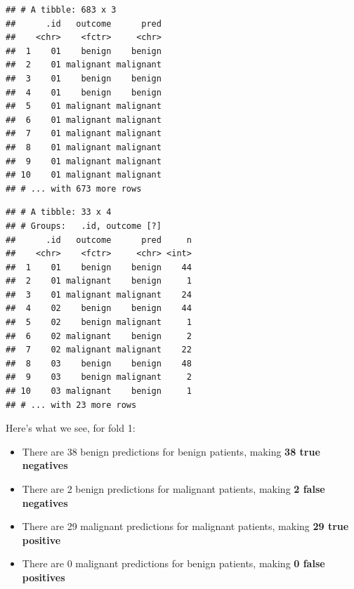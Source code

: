 \documentclass[]{article}
\newenvironment{Shaded}{\begin{snugshade}}{\end{snugshade}}
\newcommand{\KeywordTok}[1]{\textcolor[rgb]{0.13,0.29,0.53}{\textbf{#1}}}
\newcommand{\DataTypeTok}[1]{\textcolor[rgb]{0.13,0.29,0.53}{#1}}
\newcommand{\FloatTok}[1]{\textcolor[rgb]{0.00,0.00,0.81}{#1}}
\newcommand{\StringTok}[1]{\textcolor[rgb]{0.31,0.60,0.02}{#1}}
\newcommand{\OperatorTok}[1]{\textcolor[rgb]{0.81,0.36,0.00}{\textbf{#1}}}
\newcommand{\NormalTok}[1]{#1}
\providecommand{\tightlist}{%
  \setlength{\itemsep}{0pt}\setlength{\parskip}{0pt}}
\begin{document}
\begin{verbatim}
## # A tibble: 683 x 3
##      .id   outcome      pred
##    <chr>    <fctr>     <chr>
##  1    01    benign    benign
##  2    01 malignant malignant
##  3    01    benign    benign
##  4    01    benign    benign
##  5    01 malignant malignant
##  6    01 malignant malignant
##  7    01 malignant malignant
##  8    01 malignant malignant
##  9    01 malignant malignant
## 10    01 malignant malignant
## # ... with 673 more rows
\end{verbatim}

\begin{Shaded}
\end{Shaded}

\begin{verbatim}
## # A tibble: 33 x 4
## # Groups:   .id, outcome [?]
##      .id   outcome      pred     n
##    <chr>    <fctr>     <chr> <int>
##  1    01    benign    benign    44
##  2    01 malignant    benign     1
##  3    01 malignant malignant    24
##  4    02    benign    benign    44
##  5    02    benign malignant     1
##  6    02 malignant    benign     2
##  7    02 malignant malignant    22
##  8    03    benign    benign    48
##  9    03    benign malignant     2
## 10    03 malignant    benign     1
## # ... with 23 more rows
\end{verbatim}

Here's what we see, for fold 1:

\begin{itemize}
\tightlist
\item
  There are 38 benign predictions for benign patients, making \textbf{38
  true negatives}
\item
  There are 2 benign predictions for malignant patients, making
  \textbf{2 false negatives}
\item
  There are 29 malignant predictions for malignant patients, making
  \textbf{29 true positive}
\item
  There are 0 malignant predictions for benign patients, making
  \textbf{0 false positives}
\end{itemize}
\end{document}

